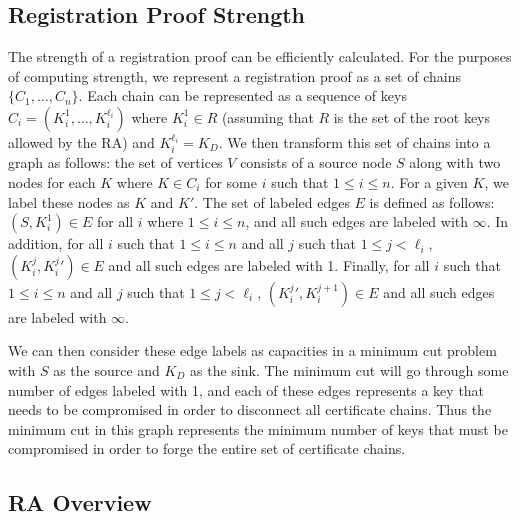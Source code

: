 
\subsection{Registration Proof Strength}
\label{sec:ra:proof}

The strength of a registration proof can be efficiently calculated. For the
purposes of computing strength, we represent a registration proof as a set of
chains $\{C_1, \ldots, C_n\}$. Each chain can be represented as a sequence of
keys $C_i = (K_i^1, \ldots, K_i^{\ell_i})$ where $K_i^1 \in R$ (assuming that
$R$ is the set of the root keys allowed by the RA) and $K_i^{\ell_i} = K_D$. We
then transform this set of chains into a graph as follows: the set of vertices
$V$ consists of a source node $S$ along with two nodes for each $K$ where $K \in
C_i$ for some $i$ such that $1 \le i \le n$. For a given $K$, we label these
nodes as $K$ and $K'$. The set of labeled edges $E$ is defined as follows: $(S,
K_i^1) \in E$ for all $i$ where $1 \le i \le n$, and all such edges are labeled
with $\infty$. In addition, for all $i$ such that $1 \le i \le n$ and all $j$
such that $1 \le j < \ell_i$, $(K_i^j, {K_i^j}') \in E$ and all such edges are
labeled with 1. Finally, for all $i$ such that $1 \le i \le n$ and all $j$ such
that $1 \le j < \ell_i$, $({K_i^j}', K_i^{j+1}) \in E$ and all such edges are
labeled with $\infty$.

We can then consider these edge labels as capacities in a minimum cut problem
with $S$ as the source and $K_D$ as the sink. The minimum cut will go through
some number of edges labeled with 1, and each of these edges represents a key
that needs to be compromised in order to disconnect all certificate chains. Thus
the minimum cut in this graph represents the minimum number of keys that must be
compromised in order to forge the entire set of certificate chains.

\subsection{RA Overview}
\label{sec:ra:overview}

